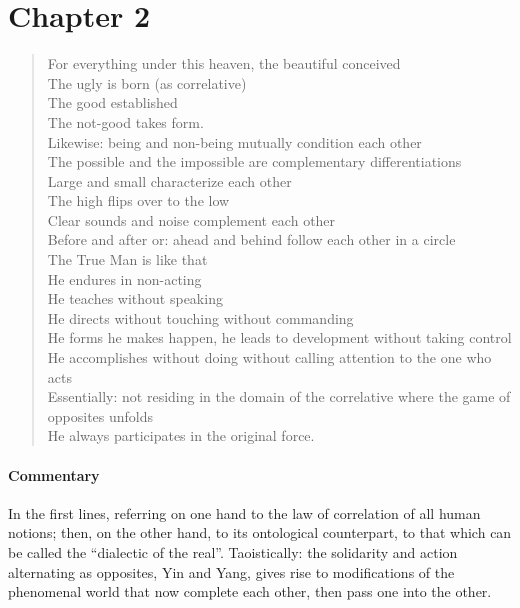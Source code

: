 \section{Chapter 2}

\begin{quotex}
\begin{verse}
For everything under this heaven, the beautiful conceived\\
The ugly is born (as correlative)\\
The good established\\
The not-good takes form.\\
Likewise: being and non-being mutually condition each other\\
The possible and the impossible are complementary differentiations\\
Large and small characterize each other\\
The high flips over to the low\\
Clear sounds and noise complement each other\\
Before and after or: ahead and behind follow each other in a circle\\
The True Man is like that\\
He endures in non-acting\\
He teaches without speaking\\
He directs without touching without commanding \\
He forms he makes happen, he leads to development without taking control\\
He accomplishes without doing without calling attention to the one who acts \\
Essentially: not residing in the domain of the correlative where the game of opposites unfolds \\
He always participates in the original force.
\end{verse}
\end{quotex}

\paragraph{Commentary}


In the first lines, referring on one hand to the law of correlation of all human notions; then, on the other hand, to its ontological counterpart, to that which can be called the ``dialectic of the real''. Taoistically: the solidarity and action alternating as opposites, Yin and Yang, gives rise to modifications of the phenomenal world that now complete each other, then pass one into the other.

